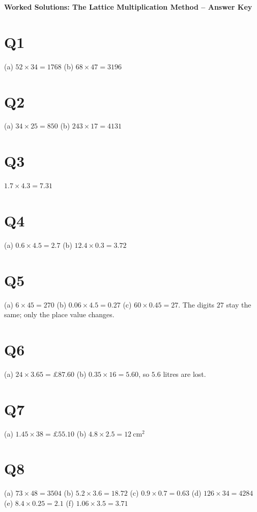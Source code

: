 \documentclass[12pt,a4paper]{article}
\begin{document}
\begin{center}
  {\Large\bfseries Worked Solutions: The Lattice Multiplication Method -- Answer Key}
\end{center}

\section*{Q1}
(a) \(52\times34=1768\)\quad
(b) \(68\times47=3196\)

\section*{Q2}
(a) \(34\times25=850\)\quad
(b) \(243\times17=4131\)

\section*{Q3}
\(1.7\times4.3=7.31\)

\section*{Q4}
(a) \(0.6\times4.5=2.7\)\quad
(b) \(12.4\times0.3=3.72\)

\section*{Q5}
(a) \(6\times45=270\)\quad
(b) \(0.06\times4.5=0.27\)\quad
(c) \(60\times0.45=27\).
The digits \(27\) stay the same; only the place value changes.

\section*{Q6}
(a) \(24\times3.65=\pounds87.60\)\quad
(b) \(0.35\times16=5.60\), so \(5.6\) litres are lost.

\section*{Q7}
(a) \(1.45\times38=\pounds55.10\)\quad
(b) \(4.8\times2.5=12\ \mathrm{cm}^2\)

\section*{Q8}
(a) \(73\times48=3504\)\quad
(b) \(5.2\times3.6=18.72\)\quad
(c) \(0.9\times0.7=0.63\)\quad
(d) \(126\times34=4284\)\quad
(e) \(8.4\times0.25=2.1\)\quad
(f) \(1.06\times3.5=3.71\)
\end{document}
